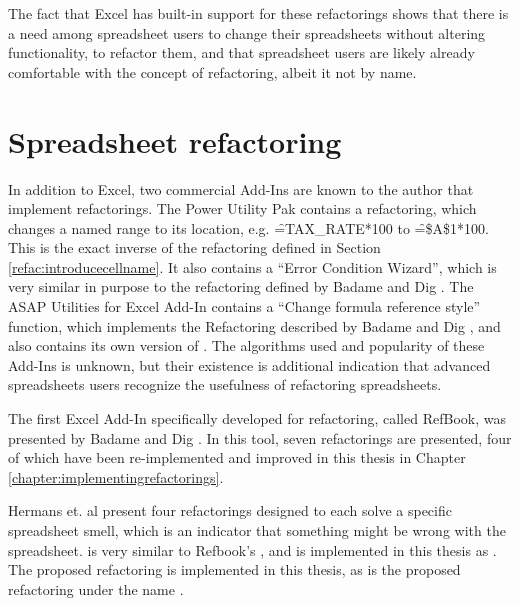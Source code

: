 The fact that Excel has built-in support for these refactorings shows that there is a need among spreadsheet users to change their spreadsheets without altering functionality, to refactor them, and that spreadsheet users are likely already comfortable with the concept of refactoring, albeit it not by name.

\section{Spreadsheet refactoring}

In addition to Excel, two commercial Add-Ins are known to the author that implement refactorings.
The Power Utility Pak \cite{PuPv7} contains a  refactoring, which changes a named range to its location, e.g. \f{=TAX_RATE*100} to \f{=\$A\$1*100}.
This is the exact inverse of the  refactoring defined in Section \ref{refac:introducecellname}.
It also contains a ``Error Condition Wizard'', which is very similar in purpose to the  refactoring defined by Badame and Dig \cite{badame2012refactoring}.
The ASAP Utilities for Excel \cite{ASAP5} Add-In contains a ``Change formula reference style'' function, which implements the  Refactoring described by Badame and Dig \cite{badame2012refactoring}, and also contains its own version of .
The algorithms used and popularity of these Add-Ins is unknown, but their existence is additional indication that advanced spreadsheets users recognize the usefulness of refactoring spreadsheets.

The first Excel Add-In specifically developed for refactoring, called RefBook, was presented by Badame and Dig \cite{badame2012refactoring}.
In this tool, seven refactorings are presented, four of which have been re-implemented and improved in this thesis in Chapter \ref{chapter:implementingrefactorings}.

Hermans et. al \cite{hermans2014detecting} present four refactorings designed to each solve a specific spreadsheet smell, which is an indicator that something might be wrong with the spreadsheet.
 is very similar to Refbook's , and is implemented in this thesis as .
The proposed  refactoring is implemented in this thesis, as is the proposed  refactoring under the name .

\newpage

